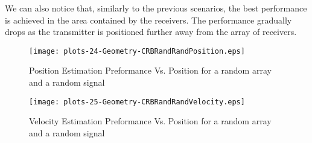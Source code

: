We can also notice that, similarly to the previous scenarios, the best performance is achieved in the area contained by the receivers. The performance gradually drops as the transmitter is positioned further away from the array of receivers.

\begin{figure}
\begin{center}
\texttt{[image: plots-24-Geometry-CRBRandRandPosition.eps]} 
\end{center}
\caption[Position Estimation Preformance Vs. Position for a random array and a random signal]
{Position Estimation Preformance Vs. Position for a random array and a random signal}
\label{fig:CRBRandRandPosition}
\end{figure}




\begin{figure}
\begin{center}
\texttt{[image: plots-25-Geometry-CRBRandRandVelocity.eps]} 
\end{center}
\caption[Velocity Estimation Preformance Vs. Position for a random array and a random signal]
{Velocity Estimation Preformance Vs. Position for a random array and a random signal}
\label{fig:CRBRandRandVelocity}
\end{figure}

